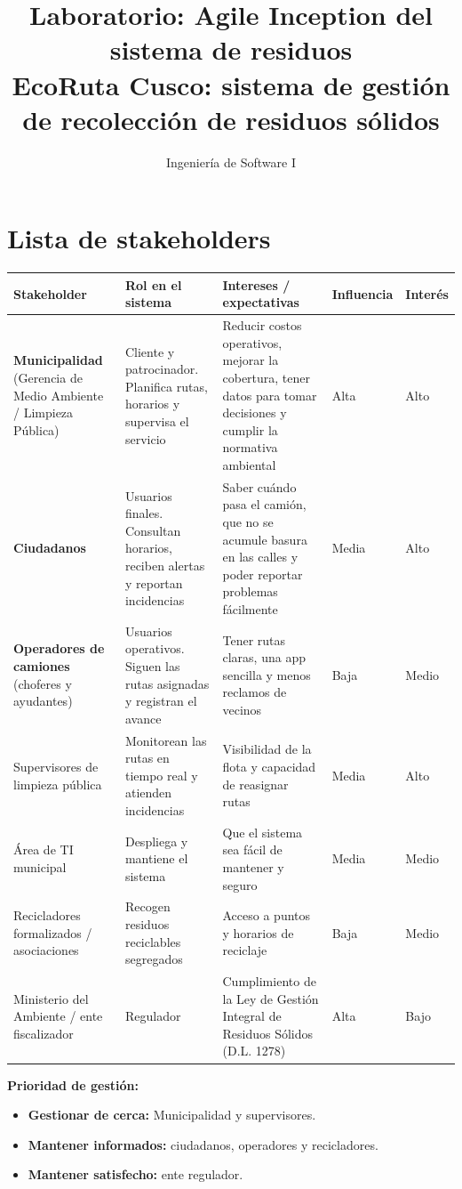 \documentclass[11pt,a4paper]{article}
\title{\textbf{Laboratorio: Agile Inception del sistema de residuos}\\[0.4em]
\large EcoRuta Cusco: sistema de gestión de recolección de residuos sólidos}
\author{Ingeniería de Software I}
\date{}
\begin{document}
\maketitle

\section{Lista de stakeholders}

{\small
\begin{longtable}{L{2.7cm} L{3.6cm} L{4.6cm} C{1.6cm} C{1.3cm}}
\toprule
\textbf{Stakeholder} & \textbf{Rol en el sistema} & \textbf{Intereses / expectativas} & \textbf{Influencia} & \textbf{Interés} \\
\midrule
\endhead
\textbf{Municipalidad} (Gerencia de Medio Ambiente / Limpieza Pública) & Cliente y patrocinador. Planifica rutas, horarios y supervisa el servicio & Reducir costos operativos, mejorar la cobertura, tener datos para tomar decisiones y cumplir la normativa ambiental & Alta & Alto \\
\textbf{Ciudadanos} & Usuarios finales. Consultan horarios, reciben alertas y reportan incidencias & Saber cuándo pasa el camión, que no se acumule basura en las calles y poder reportar problemas fácilmente & Media & Alto \\
\textbf{Operadores de camiones} (choferes y ayudantes) & Usuarios operativos. Siguen las rutas asignadas y registran el avance & Tener rutas claras, una app sencilla y menos reclamos de vecinos & Baja & Medio \\
Supervisores de limpieza pública & Monitorean las rutas en tiempo real y atienden incidencias & Visibilidad de la flota y capacidad de reasignar rutas & Media & Alto \\
Área de TI municipal & Despliega y mantiene el sistema & Que el sistema sea fácil de mantener y seguro & Media & Medio \\
Recicladores formalizados / asociaciones & Recogen residuos reciclables segregados & Acceso a puntos y horarios de reciclaje & Baja & Medio \\
Ministerio del Ambiente / ente fiscalizador & Regulador & Cumplimiento de la Ley de Gestión Integral de Residuos Sólidos (D.L. 1278) & Alta & Bajo \\
\bottomrule
\end{longtable}
}

\textbf{Prioridad de gestión:}
\begin{itemize}
  \item \textbf{Gestionar de cerca:} Municipalidad y supervisores.
  \item \textbf{Mantener informados:} ciudadanos, operadores y recicladores.
  \item \textbf{Mantener satisfecho:} ente regulador.
\end{itemize}
\end{document}
